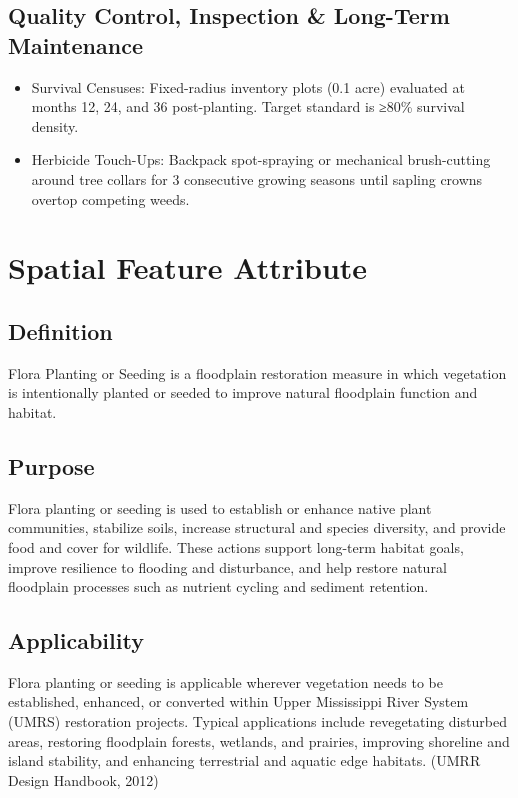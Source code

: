 \documentclass[
  letterpaper,
  DIV=11,
  numbers=noendperiod]{scrreprt}
\begin{document}
\subsection{Quality Control, Inspection \& Long-Term
Maintenance}\label{quality-control-inspection-long-term-maintenance-4}

\begin{itemize}
\item
  Survival Censuses: Fixed-radius inventory plots (0.1 acre) evaluated
  at months 12, 24, and 36 post-planting. Target standard is ≥80\%
  survival density.
\item
  Herbicide Touch-Ups: Backpack spot-spraying or mechanical
  brush-cutting around tree collars for 3 consecutive growing seasons
  until sapling crowns overtop competing weeds.
\end{itemize}

\section{Spatial Feature Attribute}\label{spatial-feature-attribute-3}

\subsection{Definition}\label{definition-4}

Flora Planting or Seeding is a floodplain restoration measure in which
vegetation is intentionally planted or seeded to improve natural
floodplain function and habitat.

\subsection{Purpose}\label{purpose-6}

Flora planting or seeding is used to establish or enhance native plant
communities, stabilize soils, increase structural and species diversity,
and provide food and cover for wildlife. These actions support long-term
habitat goals, improve resilience to flooding and disturbance, and help
restore natural floodplain processes such as nutrient cycling and
sediment retention.

\subsection{Applicability}\label{applicability-4}

Flora planting or seeding is applicable wherever vegetation needs to be
established, enhanced, or converted within Upper Mississippi River
System (UMRS) restoration projects. Typical applications include
revegetating disturbed areas, restoring floodplain forests, wetlands,
and prairies, improving shoreline and island stability, and enhancing
terrestrial and aquatic edge habitats. (UMRR Design Handbook, 2012)
\end{document}
